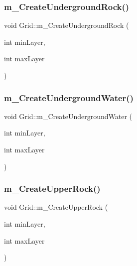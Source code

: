 \subsubsection{\texorpdfstring{m\+\_\+\+Create\+Underground\+Rock()}{m\_CreateUndergroundRock()}}
{\footnotesize\ttfamily void Grid\+::m\+\_\+\+Create\+Underground\+Rock (\begin{DoxyParamCaption}\item[{int}]{min\+Layer,  }\item[{int}]{max\+Layer }\end{DoxyParamCaption})}

\mbox{\label{class_grid_a32c88ba0de0530b6d4c1b0ab2cde31dc}} 
\subsubsection{\texorpdfstring{m\+\_\+\+Create\+Underground\+Water()}{m\_CreateUndergroundWater()}}
{\footnotesize\ttfamily void Grid\+::m\+\_\+\+Create\+Underground\+Water (\begin{DoxyParamCaption}\item[{int}]{min\+Layer,  }\item[{int}]{max\+Layer }\end{DoxyParamCaption})}

\mbox{\label{class_grid_a121458c828be458c452e5f6c80c07cc9}} 
\subsubsection{\texorpdfstring{m\+\_\+\+Create\+Upper\+Rock()}{m\_CreateUpperRock()}}
{\footnotesize\ttfamily void Grid\+::m\+\_\+\+Create\+Upper\+Rock (\begin{DoxyParamCaption}\item[{int}]{min\+Layer,  }\item[{int}]{max\+Layer }\end{DoxyParamCaption})}

\mbox{\label{class_grid_a7ffff576d982720579377833e17fd63f}} 
